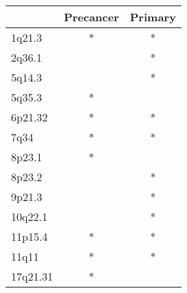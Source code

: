 \begin{tabular}{lcc}
\toprule
{} & Precancer & Primary \\
\midrule
1q21.3   &         * &       * \\
2q36.1   &           &       * \\
5q14.3   &           &       * \\
5q35.3   &         * &         \\
6p21.32  &         * &       * \\
7q34     &         * &       * \\
8p23.1   &         * &         \\
8p23.2   &           &       * \\
9p21.3   &           &       * \\
10q22.1  &           &       * \\
11p15.4  &         * &       * \\
11q11    &         * &       * \\
17q21.31 &         * &         \\
\bottomrule
\end{tabular}
